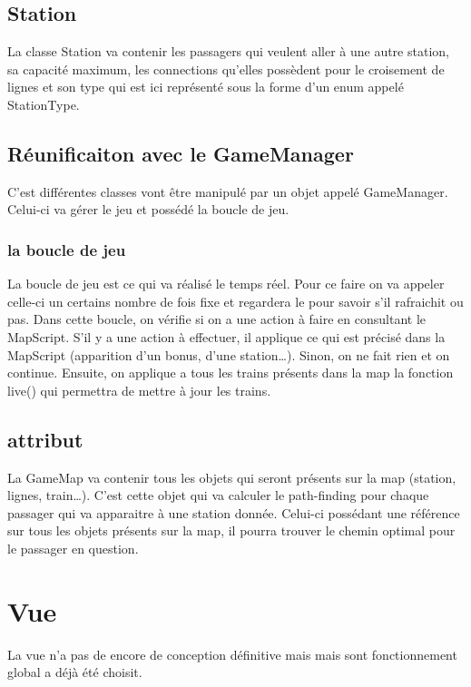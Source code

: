 \documentclass[report, backcover, french, nodocumentinfo]{upmethodology-document}
\begin{document}
			\subsection{Station}
				La classe Station va contenir les passagers qui veulent aller à une autre station, sa capacité maximum, les connections qu'elles possèdent pour le croisement de lignes et son type qui est ici représenté sous la forme d'un enum appelé StationType.
			\subsection{Réunificaiton avec le GameManager}
				C'est différentes classes vont être manipulé par un objet appelé GameManager. Celui-ci va gérer le jeu et possédé la boucle de jeu.
				\subsubsection{la boucle de jeu}
					La boucle de jeu est ce qui va réalisé le temps réel. Pour ce faire on va appeler celle-ci un certains nombre de fois fixe et regardera le  pour savoir s'il rafraichit ou pas. Dans cette boucle, on vérifie si on a une action à faire en consultant le MapScript. S'il y a une action à effectuer, il applique ce qui est précisé dans la MapScript (apparition d'un bonus, d'une station\ldots). Sinon, on ne fait rien et on continue. Ensuite, on applique a tous les trains présents dans la map la fonction live() qui permettra de mettre à jour les trains.
				\subsection{attribut}
				 La GameMap va contenir tous les objets qui seront présents sur la map (station, lignes, train\ldots). C'est cette objet qui va calculer le path-finding pour chaque passager qui va apparaitre à une station donnée. Celui-ci possédant une référence sur tous les objets présents sur la map, il pourra trouver le chemin optimal pour le passager en question.
		\section{Vue}
			La vue n'a pas de encore de conception définitive mais mais sont fonctionnement global a déjà été choisit.
\end{document}
